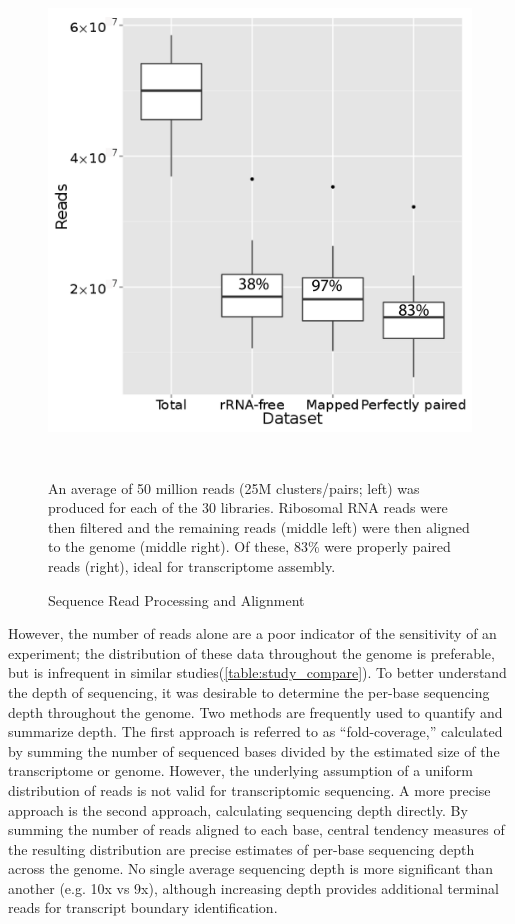 \begin{figure}
\small
\includegraphics[width=\textwidth,height=5in]{images/Sequencing/Alignment_reads.png}
\caption{Sequence Read Processing and Alignment}\label{fig:4.4}
An average of 50 million reads (25M clusters/pairs; left) was produced for each of the 30 libraries. Ribosomal RNA reads were then filtered and the remaining reads (middle left) were then aligned to the genome (middle right). Of these, 83\% were properly paired reads (right), ideal for transcriptome assembly.
\end{figure}

However, the number of reads alone are a poor indicator of the sensitivity of an experiment; the distribution of these data throughout the genome is preferable, but is infrequent in similar studies(\ref{table:study_compare}). To better understand the depth of sequencing, it was desirable to determine the per-base sequencing depth throughout the genome. Two methods are frequently used to quantify and summarize depth. The first approach is referred to as ``fold-coverage,'' calculated by summing the number of sequenced bases divided by the estimated size of the transcriptome or genome. However, the underlying assumption of a uniform distribution of reads is not valid for transcriptomic sequencing. A more precise approach is the second approach, calculating sequencing depth directly. By summing the number of reads aligned to each base, central tendency measures of the resulting distribution are precise estimates of per-base sequencing depth across the genome. No single average sequencing depth is more significant than another (e.g. 10x vs 9x), although increasing depth provides additional terminal reads for transcript boundary identification. 

